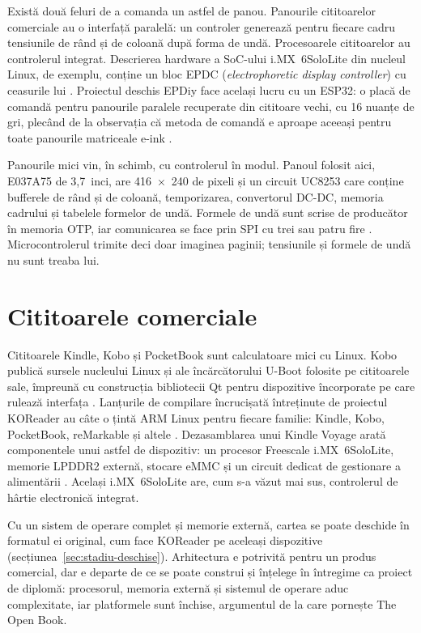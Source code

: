 Există două feluri de a comanda un astfel de panou. Panourile
cititoarelor comerciale au o interfață paralelă: un controler generează
pentru fiecare cadru tensiunile de rând și de coloană după forma de undă.
Procesoarele cititoarelor au controlerul integrat. Descrierea hardware a
SoC-ului i.MX~6SoloLite din nucleul Linux, de exemplu, conține un bloc EPDC
(\emph{electrophoretic display controller}) cu ceasurile lui
\citep{linux-imx6sl}. Proiectul deschis EPDiy face același lucru cu un ESP32:
o placă de comandă pentru panourile paralele recuperate din cititoare vechi,
cu 16 nuanțe de gri, plecând de la observația că metoda de comandă e aproape
aceeași pentru toate panourile matriceale e-ink \citep{epdiy}.

Panourile mici vin, în schimb, cu controlerul în modul. Panoul folosit aici,
E037A75 de 3,7~inci, are 416~×~240 de pixeli și un circuit UC8253 care
conține bufferele de rând și de coloană, temporizarea, convertorul DC-DC,
memoria cadrului și tabelele formelor de undă. Formele de undă sunt scrise de
producător în memoria OTP, iar comunicarea se face prin SPI cu trei sau patru
fire \citep{e037a75}. Microcontrolerul trimite deci doar imaginea paginii;
tensiunile și formele de undă nu sunt treaba lui.

\section{Cititoarele comerciale}
\label{sec:stadiu-comerciale}

Cititoarele Kindle, Kobo și PocketBook sunt calculatoare mici cu Linux. Kobo
publică sursele nucleului Linux și ale încărcătorului U-Boot folosite pe
cititoarele sale, împreună cu construcția bibliotecii Qt pentru dispozitive
încorporate pe care rulează interfața \citep{kobo-gpl}. Lanțurile de
compilare încrucișată întreținute de proiectul KOReader au câte o țintă ARM
Linux pentru fiecare familie: Kindle, Kobo, PocketBook, reMarkable și altele
\citep{koxtoolchain}. Dezasamblarea unui Kindle Voyage arată componentele unui
astfel de dispozitiv: un procesor Freescale i.MX~6SoloLite, memorie LPDDR2
externă, stocare eMMC și un circuit dedicat de gestionare a alimentării
\citep{ifixit-voyage}. Același i.MX~6SoloLite are, cum s-a văzut mai sus,
controlerul de hârtie electronică integrat.

Cu un sistem de operare complet și memorie externă, cartea se poate deschide
în formatul ei original, cum face KOReader pe aceleași dispozitive
(secțiunea~\ref{sec:stadiu-deschise}). Arhitectura e potrivită pentru un
produs comercial, dar e departe de ce se poate construi și înțelege în
întregime ca proiect de diplomă: procesorul, memoria externă și sistemul de
operare aduc complexitate, iar platformele sunt închise, argumentul de la care
pornește The Open Book.

